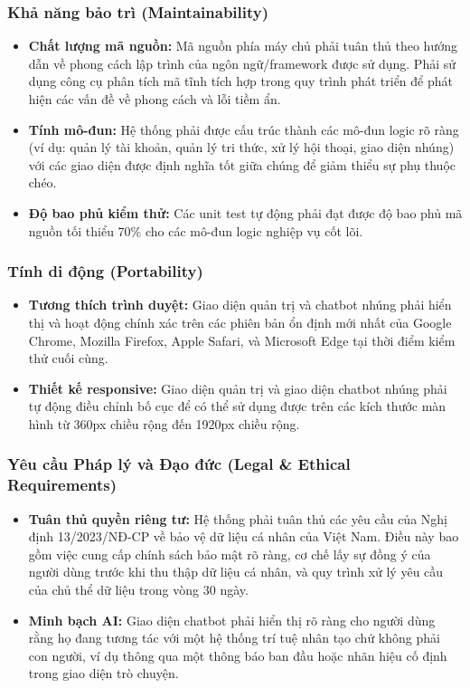 \subsubsection{Khả năng bảo trì (Maintainability)}
\begin{itemize}
    \item \textbf{Chất lượng mã nguồn:} Mã nguồn phía máy chủ phải tuân thủ theo hướng dẫn về phong cách lập trình của ngôn ngữ/framework được sử dụng. Phải sử dụng công cụ phân tích mã tĩnh tích hợp trong quy trình phát triển để phát hiện các vấn đề về phong cách và lỗi tiềm ẩn.
    \item \textbf{Tính mô-đun:} Hệ thống phải được cấu trúc thành các mô-đun logic rõ ràng (ví dụ: quản lý tài khoản, quản lý tri thức, xử lý hội thoại, giao diện nhúng) với các giao diện được định nghĩa tốt giữa chúng để giảm thiểu sự phụ thuộc chéo.
    \item \textbf{Độ bao phủ kiểm thử:} Các unit test tự động phải đạt được độ bao phủ mã nguồn tối thiểu 70\% cho các mô-đun logic nghiệp vụ cốt lõi.
\end{itemize}
\subsubsection{Tính di động (Portability)}
\begin{itemize}
    \item \textbf{Tương thích trình duyệt:} Giao diện quản trị và chatbot nhúng phải hiển thị và hoạt động chính xác trên các phiên bản ổn định mới nhất của Google Chrome, Mozilla Firefox, Apple Safari, và Microsoft Edge tại thời điểm kiểm thử cuối cùng.
    \item \textbf{Thiết kế responsive:} Giao diện quản trị và giao diện chatbot nhúng phải tự động điều chỉnh bố cục để có thể sử dụng được trên các kích thước màn hình từ 360px chiều rộng đến 1920px chiều rộng.
\end{itemize}
\subsubsection{Yêu cầu Pháp lý và Đạo đức (Legal \& Ethical Requirements)}
\begin{itemize}
    \item \textbf{Tuân thủ quyền riêng tư:} Hệ thống phải tuân thủ các yêu cầu của Nghị định 13/2023/NĐ-CP về bảo vệ dữ liệu cá nhân của Việt Nam. Điều này bao gồm việc cung cấp chính sách bảo mật rõ ràng, cơ chế lấy sự đồng ý của người dùng trước khi thu thập dữ liệu cá nhân, và quy trình xử lý yêu cầu của chủ thể dữ liệu trong vòng 30 ngày.
    \item \textbf{Minh bạch AI:} Giao diện chatbot phải hiển thị rõ ràng cho người dùng rằng họ đang tương tác với một hệ thống trí tuệ nhân tạo chứ không phải con người, ví dụ thông qua một thông báo ban đầu hoặc nhãn hiệu cố định trong giao diện trò chuyện.
\end{itemize}

